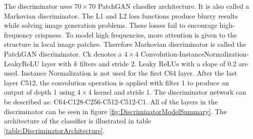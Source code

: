 The discriminator uses $70 \times 70$ PatchGAN classfier architecture\cite{isola2018imagetoimage}. It is also called a Markovian discriminator\cite{li2016precomputed}. The L1 and L2 loss functions produce blurry results while solving image generation problems\cite{ledig2017photorealistic}. These losses fail to encourage high-frequency crispness\cite{ledig2017photorealistic}. To model high frequencies, more attention is given to the structure in local image patches\cite{isola2018imagetoimage}. Therefore Markovian discriminator is called the PatchGAN discriminator. {\selectfont Ck} denotes a $4 \times 4$ Convolution-InstanceNormalization-LeakyReLU layer with $k$ filters and stride 2. Leaky ReLUs with a slope of 0.2 are used. Instance Normalization is not used for the first {\selectfont C64} layer. After the last layer {\selectfont C512}, the convolution operation is applied with filter 1 to produce an output of depth 1 using $4 \times 4$ kernel and stride 1. The discriminator network can be described as: {\selectfont C64-C128-C256-C512-C512-C1}. All of the layers in the discriminator can be seen in figure \ref{fig:DiscriminatorModelSummary}. The architecture of the classifier is illustrated in table \ref{table:DiscriminatorArchitecture}.





